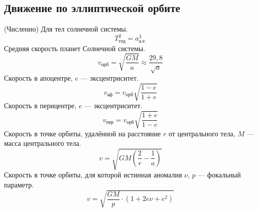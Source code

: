 \subsection{Движение по эллиптической орбите}

(Численно) Для тел солнечной системы.\begin{equation}T^2_{\text{год}}=a^3_{\text{а.е.}}
\end{equation}
Средняя скорость планет Солнечной системы.\begin{equation}v_{\text{орб}}=\sqrt{\frac{GM}{a}}\approx \frac{29,8}{\sqrt{a}}
\end{equation}
Скорость в апоцентре, $e$ --- эксцентриситет.\begin{equation}v_{\text{аф}}=v_{\text{орб}}\sqrt{\frac{1-e}{1+e}}
\end{equation}
Скорость в перицентре, $e$ --- эксцентриситет.\begin{equation}v_{\text{пер}}=v_{\text{орб}}\sqrt{\frac{1+e}{1-e}}
\end{equation}
Скорость в точке орбиты, удалённой на расстояние $r$ от центрального тела, $M$ --- масса центрального тела.\begin{equation}v=\sqrt{GM\left(\frac2r - \frac1a\right)}
\end{equation}
Скорость в точке орбиты, для которой истинная аномалия $\nu$, $p$ --- фокальный параметр.\begin{equation}v=\sqrt{\frac{GM}{p}\cdot(1+2e\nu+e^2)}
\end{equation}